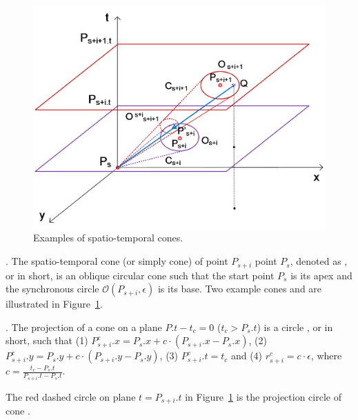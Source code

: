 \begin{figure}[tb!]
\centering
\includegraphics[scale=0.64]{figures/Fig-cis.png}
\vspace{-2ex}
\caption{\small Examples of spatio-temporal cones. }
\vspace{-3ex}
\label{fig:cis}
\end{figure}



. The spatio-temporal cone (or simply cone) of point $P_{s+i}$ \wrt point $P_s$, denoted as , or  in short, is an oblique circular cone such that the start point $P_s$ is its apex and the synchronous circle $\mathcal{O}(P_{s+i}, \epsilon)$ is its base.
%
Two example cones  and  are illustrated in Figure~\ref{fig:cis}.

. The projection of a cone  on a plane $P.t- t_c = 0$ ($t_c > P_s.t$) is a circle , or  in short, such that
%
(1) $P^c_{s+i}.x = P_s.x +  c\cdot(P_{s+i}.x- P_{s}.x)$,
%
(2) $P^c_{s+i}.y = P_s.y +  c\cdot(P_{s+i}.y- P_{s}.y)$,
%
(3) $P^c_{s+i}.t = t_c$ and
%
(4) $r^c_{s+i} =c\cdot\epsilon$, where $c=\frac{t_c - P_s.t}{P_{s+i}.t - P_s.t}$.


The red dashed circle  on plane $t=P_{s+i}.t$ in Figure~\ref{fig:cis} is the projection circle of cone .


